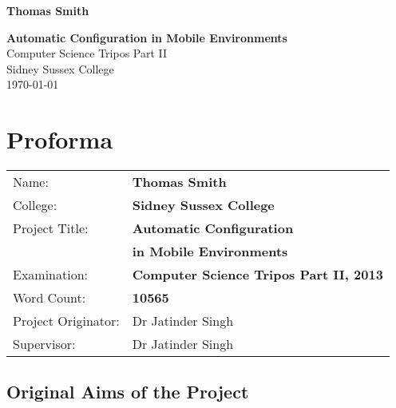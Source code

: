 \documentclass[12pt,twoside,notitlepage]{report}
\begin{document}





\pagestyle{empty}

\hfill{\LARGE \bf Thomas Smith}

\vspace*{60mm}
\begin{center}
\Huge
{\bf Automatic Configuration in Mobile Environments} \\
\vspace*{5mm}
Computer Science Tripos Part II \\
\vspace*{5mm}
Sidney Sussex College \\
\vspace*{5mm}
\today  %
\end{center}

\cleardoublepage


\setcounter{page}{1}
\pagestyle{plain}

\chapter*{Proforma}

{\large
\begin{tabular}{ll}
Name:               & \bf Thomas Smith	\\
College:            & \bf Sidney Sussex College	\\
Project Title:      & \bf Automatic Configuration \\ &\bf in Mobile Environments	\\
Examination:        & \bf Computer Science Tripos Part II, 2013 	\\
Word Count:         & \bf 10565\footnotemark[1] \\
Project Originator: & Dr Jatinder Singh		\\
Supervisor:         & Dr Jatinder Singh		\\ 
\end{tabular}
}



\section*{Original Aims of the Project}
\end{document}
